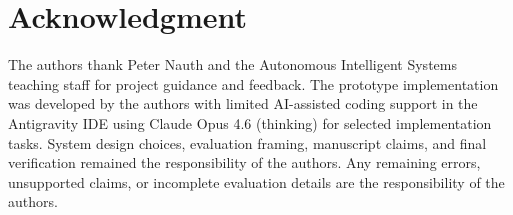 \documentclass[conference]{IEEEtran}
\begin{document}
\section*{Acknowledgment}
The authors thank Peter Nauth and the Autonomous Intelligent Systems teaching staff for project guidance and feedback. The prototype implementation was developed by the authors with limited AI-assisted coding support in the Antigravity IDE using Claude Opus 4.6 (thinking) for selected implementation tasks. System design choices, evaluation framing, manuscript claims, and final verification remained the responsibility of the authors. Any remaining errors, unsupported claims, or incomplete evaluation details are the responsibility of the authors.



\end{document}

